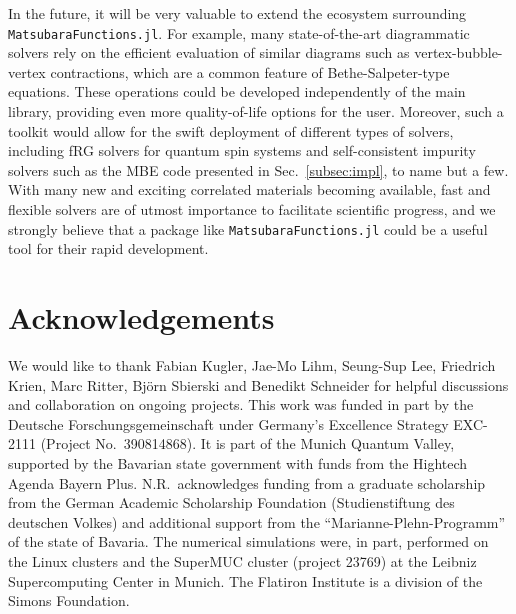 \documentclass{SciPost}
\begin{document}
In the future, it will be very valuable to extend the ecosystem surrounding \\ \texttt{MatsubaraFunctions.jl}. For example, many state-of-the-art diagrammatic solvers rely on the efficient evaluation of similar diagrams such as vertex-bubble-vertex contractions, which are a common feature of Bethe-Salpeter-type equations. These operations could be developed independently of the main library, providing even more quality-of-life options for the user. Moreover, such a toolkit would allow for the swift deployment of different types of solvers, including fRG solvers for quantum spin systems and self-consistent impurity solvers such as the MBE code presented in Sec.~\ref{subsec:impl}, to name but a few. With many new and exciting correlated materials becoming available, fast and flexible solvers are of utmost importance to facilitate scientific progress, and we strongly believe that a package like \texttt{MatsubaraFunctions.jl} could be a useful tool for their rapid development.

\section{Acknowledgements}

We would like to thank Fabian Kugler, Jae-Mo Lihm, Seung-Sup Lee, Friedrich Krien, Marc Ritter, Björn Sbierski and Benedikt Schneider for helpful discussions and collaboration on ongoing projects. This work was funded in part by the Deutsche Forschungsgemeinschaft under Germany's Excellence Strategy EXC-2111 (Project No.\ 390814868). It is part of the  Munich Quantum Valley, supported by the Bavarian state government with funds from the Hightech Agenda Bayern Plus. N.R.~acknowledges funding from a graduate scholarship from the German Academic Scholarship Foundation (Studienstiftung des deutschen Volkes) and additional support from the ``Marianne-Plehn-Programm'' of the state of Bavaria. The numerical
simulations were, in part, performed on the Linux clusters and the SuperMUC cluster (project 23769) at the Leibniz Supercomputing Center in Munich. The Flatiron Institute is a division of the Simons Foundation. 

%

\end{document}
